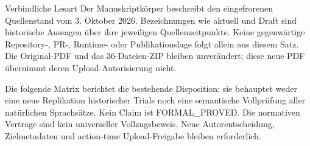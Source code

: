 \raggedright
{}
\begin{boundary}{Verbindliche Lesart}
Der Manuskriptkörper beschreibt den eingefrorenen Quellenstand vom 3. Oktober 2026. Bezeichnungen wie aktuell und Draft sind historische Aussagen über ihre jeweiligen Quellenzeitpunkte. Keine gegenwärtige Repository-, PR-, Runtime- oder Publikationslage folgt allein aus diesem Satz. Die Original-PDF und das 36-Dateien-ZIP bleiben unverändert; diese neue PDF übernimmt deren Upload-Autorisierung nicht.

Die folgende Matrix berichtet die bestehende Disposition; sie behauptet weder eine neue Replikation historischer Trials noch eine semantische Vollprüfung aller natürlichen Sprachsätze. Kein Claim ist FORMAL\_PROVED. Die normativen Verträge sind kein universeller Vollzugsbeweis. Neue Autorentscheidung, Zielmetadaten und action-time Upload-Freigabe bleiben erforderlich.
\end{boundary}
